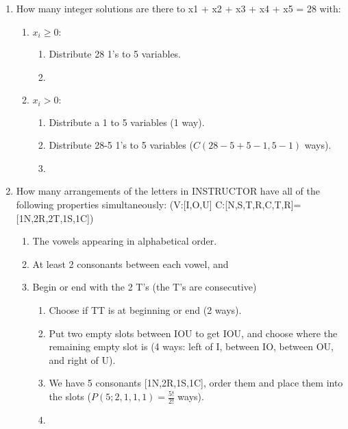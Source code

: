 \documentclass[12pt]{amsart}
\begin{document}
\begin{enumerate}
\item How many integer solutions are there to x1 + x2 + x3 + x4 + x5 = 28 with:
    \begin{enumerate}
        \item $x_i\geq0: $ \begin{enumerate}
            \item Distribute 28 1's to 5 variables.
            \item {}
        \end{enumerate}
        \item $x_i>0: $ \begin{enumerate}
            \item Distribute a 1 to 5 variables (1 way).
            \item Distribute 28-5 1's to 5 variables ($C(28-5+5-1, 5-1)$ ways).
            \item {}
        \end{enumerate}
    \end{enumerate}
    
\item How many arrangements of the letters in INSTRUCTOR have all of the following
properties simultaneously: (V:[I,O,U] C:[N,S,T,R,C,T,R]=[1N,2R,2T,1S,1C]) 
    \begin{enumerate}
        \item  The vowels appearing in alphabetical order.
        \item At least 2 consonants between each vowel, and
        \item Begin or end with the 2 T’s (the T’s are consecutive)
        \begin{enumerate}
            \item Choose if TT is at beginning or end (2 ways). 
            \item Put two empty slots between IOU to get I\textunderscore\textunderscore O\textunderscore\textunderscore U, and choose where the remaining empty slot is (4 ways: left of I, between IO, between OU, and right of U).
            \item We have 5 consonants [1N,2R,1S,1C], order them and place them into the slots ($P(5;2,1,1,1)=\frac{5!}{2!}$ ways).
            \item {}

        \end{enumerate}
        
    \end{enumerate}
    
\end{enumerate}
\end{document}
